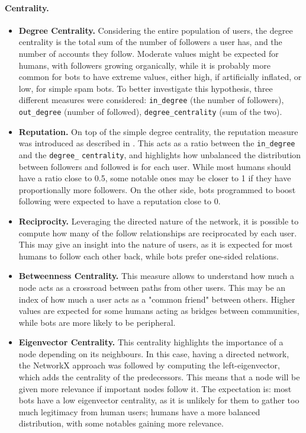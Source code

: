 \documentclass[12pt, a4paper]{article}
\begin{document}
		\paragraph{Centrality.}
		\begin{itemize}
			\item \textbf{Degree Centrality.} Considering the entire population of users, the degree centrality is the total sum of the number of followers a user has, and the number of accounts they follow. Moderate values might be expected for humans, with followers growing organically, while it is probably more common for bots to have extreme values, either high, if artificially inflated, or low, for simple spam bots. To better investigate this hypothesis, three different measures were considered: \texttt{in\_degree} (the number of followers), \texttt{out\_degree} (number of followed), \texttt{degree\_centrality} (sum of the two).
			\item \textbf{Reputation.} On top of the simple degree centrality, the reputation measure was introduced as described in \cite{wang2010}. This acts as a ratio between the \texttt{in\_degree} and the \texttt{degree\_} \texttt{centrality}, and highlights how unbalanced the distribution between followers and followed is for each user. While most humans should have a ratio close to 0.5, some notable ones may be closer to 1 if they have proportionally more followers. On the other side, bots programmed to boost following were expected to have a reputation close to 0.
			\item \textbf{Reciprocity.} Leveraging the directed nature of the network, it is possible to compute how many of the follow relationships are reciprocated by each user. This may give an insight into the nature of users, as it is expected for most humans to follow each other back, while bots prefer one-sided relations.
			\item \textbf{Betweenness Centrality.} This measure allows to understand how much a node acts as a crossroad between paths from other users. This may be an index of how much a user acts as a "common friend" between others. Higher values are expected for some humans acting as bridges between communities, while bots are more likely to be peripheral.
			\item \textbf{Eigenvector Centrality.} This centrality highlights the importance of a node depending on its neighbours. In this case, having a directed network, the NetworkX approach was followed by computing the left-eigenvector, which adds the centrality of the predecessors. This means that a node will be given more relevance if important nodes follow it. The expectation is: most bots have a low eigenvector centrality, as it is unlikely for them to gather too much legitimacy from human users; humans have a more balanced distribution, with some notables gaining more relevance.

\end{itemize}
\end{document}
